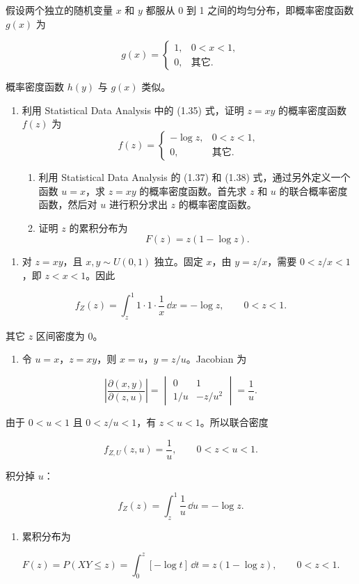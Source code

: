 \begin{question}
假设两个独立的随机变量 \(x\) 和 \(y\) 都服从 0 到 1 之间的均匀分布，即概率密度函数 \(g(x)\) 为

\[
g(x)=\begin{cases}
1, & 0<x<1,\\
0, & \text{其它}.
\end{cases}
\]

概率密度函数 \(h(y)\) 与 \(g(x)\) 类似。

\begin{enumerate}
\item 利用 Statistical Data Analysis 中的 (1.35) 式，证明 \(z=xy\) 的概率密度函数 \(f(z)\) 为
\[
f(z)=\begin{cases}
-\log z, & 0<z<1,\\
0, & \text{其它}.
\end{cases}
\]

\begin{enumerate}[start=2]
\item
  利用 Statistical Data Analysis 的 (1.37) 和 (1.38)
  式，通过另外定义一个函数 \(u=x\)，求 \(z=xy\) 的概率密度函数。首先求 \(z\) 和
  \(u\) 的联合概率密度函数，然后对 \(u\) 进行积分求出 \(z\) 的概率密度函数。
\item
  证明 \(z\) 的累积分布为
\[
  F(z)=z(1-\log z).
  \]
\end{enumerate}
\end{enumerate}
\begin{solution}
\begin{enumerate}
\item
  对 \(z=xy\)，且 \(x,y\sim U(0,1)\) 独立。固定 \(x\)，由
  \(y=z/x\)，需要 \(0<z/x<1\)，即 \(z<x<1\)。因此
\end{enumerate}

\[
f_Z(z)=\int_z^1 1\cdot1\cdot\frac{1}{x}\,\dd{x}=-\log z,\qquad 0<z<1.
\]

其它 \(z\) 区间密度为 0。

\begin{enumerate}[start=2]
\item
  令 \(u=x\)，\(z=xy\)，则 \(x=u\)，\(y=z/u\)。Jacobian 为
\end{enumerate}

\[
\left|\frac{\partial(x,y)}{\partial(z,u)}\right|=
\begin{vmatrix}
0&1\\
1/u&-z/u^2
\end{vmatrix}=\frac{1}{u}.
\]

由于 \(0<u<1\) 且 \(0<z/u<1\)，有 \(z<u<1\)。所以联合密度

\[
f_{Z,U}(z,u)=\frac1u,\qquad 0<z<u<1.
\]

积分掉 \(u\)：

\[
f_Z(z)=\int_z^1\frac1u\,\dd{u}=-\log z.
\]

\begin{enumerate}[start=3]
\item
  累积分布为
\end{enumerate}

\[
F(z)=P(XY\le z)=\int_0^z[-\log t]\,\dd{t}=z(1-\log z),\qquad 0<z<1.
\]
\end{solution}
\end{question}


